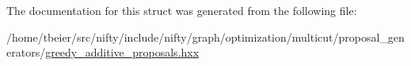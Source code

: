 The documentation for this struct was generated from the following file\+:\begin{DoxyCompactItemize}
\item 
/home/tbeier/src/nifty/include/nifty/graph/optimization/multicut/proposal\+\_\+generators/\hyperlink{greedy__additive__proposals_8hxx}{greedy\+\_\+additive\+\_\+proposals.\+hxx}\end{DoxyCompactItemize}
